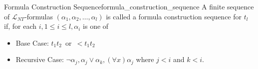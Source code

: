 \begin{definition}{Formula Construction Sequence}{formula_construction_sequence}
A finite sequence of \(\mathcal{L}_{N T}\)-formulas \(\left(\alpha_{1}, \alpha
_{2}, \ldots, \alpha _{l}\right)\) is called a formula construction sequence
for \(t_{l}\) if, for each
\(i, 1 \leq i \leq l, \alpha _{i}\)  is one of 
\begin{itemize}
    \item Base Case: \(  t _{ 1 } t _{ 2 } \enspace \text{or} \enspace  < t _{ 1 } t _{2}    \) 
    \item Recursive Case: \(\neg \alpha _{j}, \alpha _{ j } \lor \alpha _{ k } , \left(
    \forall x \right) \alpha _{ j }  \) where \(j<i\) and \(k<i\).
\end{itemize}
\end{definition}
